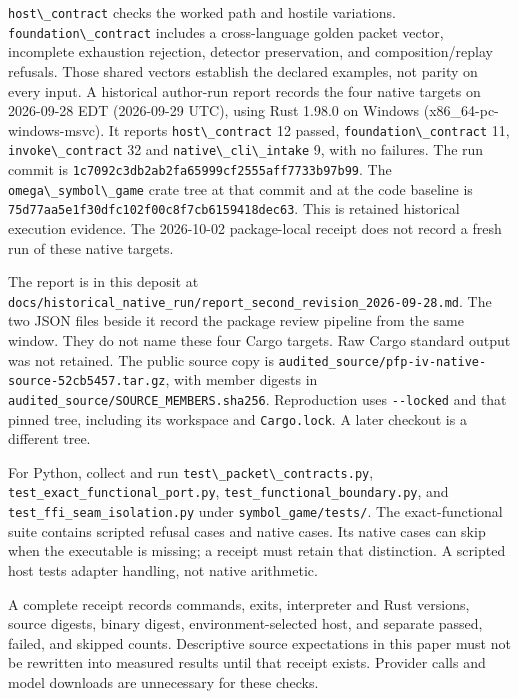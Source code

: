 \documentclass[
  11pt,
]{article}
\newcommand{\passthrough}[1]{#1}
\begin{document}
\passthrough{\lstinline!host\_contract!} checks the worked path and
hostile variations. \passthrough{\lstinline!foundation\_contract!}
includes a cross-language golden packet vector, incomplete exhaustion
rejection, detector preservation, and composition/replay refusals. Those
shared vectors establish the declared examples, not parity on every
input. A historical author-run report records the four native targets on
2026-09-28 EDT (2026-09-29 UTC), using Rust 1.98.0 on Windows
(x86\_64-pc-windows-msvc). It reports
\passthrough{\lstinline!host\_contract!} 12 passed,
\passthrough{\lstinline!foundation\_contract!} 11,
\passthrough{\lstinline!invoke\_contract!} 32 and
\passthrough{\lstinline!native\_cli\_intake!} 9, with no failures. The
run commit is \nolinkurl{1c7092c3db2ab2fa65999cf2555aff7733b97b99}. The
\passthrough{\lstinline!omega\_symbol\_game!} crate tree at that commit
and at the code baseline is
\nolinkurl{75d77aa5e1f30dfc102f00c8f7cb6159418dec63}. This is retained
historical execution evidence. The 2026-10-02 package-local receipt does
not record a fresh run of these native targets.

The report is in this deposit at
\nolinkurl{docs/historical_native_run/report_second_revision_2026-09-28.md}.
The two JSON files beside it record the package review pipeline from the
same window. They do not name these four Cargo targets. Raw Cargo
standard output was not retained. The public source copy is
\nolinkurl{audited_source/pfp-iv-native-source-52cb5457.tar.gz}, with
member digests in \nolinkurl{audited_source/SOURCE_MEMBERS.sha256}.
Reproduction uses \passthrough{\lstinline!--locked!} and that pinned
tree, including its workspace and \passthrough{\lstinline!Cargo.lock!}.
A later checkout is a different tree.

For Python, collect and run
\passthrough{\lstinline!test\_packet\_contracts.py!},
\nolinkurl{test_exact_functional_port.py},
\nolinkurl{test_functional_boundary.py}, and
\nolinkurl{test_ffi_seam_isolation.py} under
\nolinkurl{symbol_game/tests/}. The exact-functional suite
contains scripted refusal cases and native cases. Its native cases can
skip when the executable is missing; a receipt must retain that
distinction. A scripted host tests adapter handling, not native
arithmetic.

A complete receipt records commands, exits, interpreter and Rust
versions, source digests, binary digest, environment-selected host, and
separate passed, failed, and skipped counts. Descriptive source
expectations in this paper must not be rewritten into measured results
until that receipt exists. Provider calls and model downloads are
unnecessary for these checks.
\end{document}
